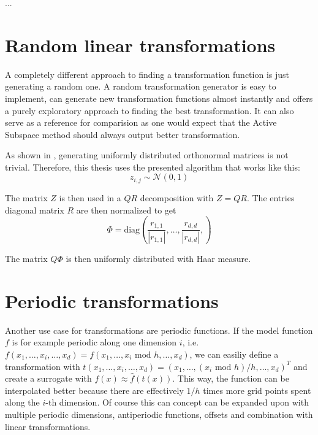 \documentclass[
  a4paper,  %
  twoside,  %
  bibliography=totoc,
  headsepline,
  cleardoublepage=empty,
  parskip=half,
  draft=false
]{scrbook}
\begin{document}
...

\section{Random linear transformations}

A completely different approach to finding a transformation function is just generating a random one.
A random transformation generator is easy to implement, can generate new transformation functions almost instantly and offers a purely exploratory approach to finding the best transformation.
It can also serve as a reference for comparision as one would expect that the Active Subspace method should always output better transformation.

As shown in \cite{ABC}, generating uniformly distributed orthonormal matrices is not trivial.
Therefore, this thesis uses the presented algorithm that works like this:
\begin{equation}
z_{i,j} \sim \mathcal{N}\left(0, 1\right)
\end{equation}

The matrix $Z$ is then used in a $QR$ decomposition with $Z=QR$.
The entries diagonal matrix $R$ are then normalized to get
\begin{equation}
\Phi=\text{diag}(\frac{r_{1,1}}{|r_{1,1}|}, \dots, \frac{r_{d,d}}{|r_{d,d}|},)
\end{equation}

The matrix $Q \Phi$ is then uniformly distributed with Haar measure.



\section{Periodic transformations}

Another use case for transformations are periodic functions.
If the model function $f$ is for example periodic along one dimension $i$, i.e. $f(x_1,\dots,x_i,\dots,x_d)=f(x_1,\dots,x_i\text{ mod } h, \dots,x_d)$, we can easiliy define a transformation with $t(x_1,\dots,x_i,\dots,x_d)=(x_1,\dots,(x_i\text{ mod } h) /h, \dots,x_d)^T$ and create a surrogate with $f(x) \approx \hat{f}(t(x))$.
This way, the function can be interpolated better because there are effectively $1 / h$ times more grid points spent along the $i$-th dimension.
Of course this can concept can be expanded upon with multiple periodic dimensions, antiperiodic functions, offsets and combination with linear transformations.
\end{document}
